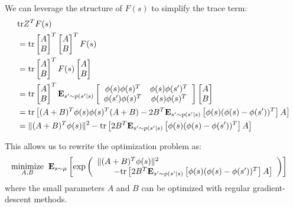 We can leverage the structure of $F(s)$ to simplify the trace term:
\begin{align}
   & \text{tr} Z^T F(s)
  \\ & = \text{tr} \begin{bmatrix} A \\ B \end{bmatrix}^T \begin{bmatrix} A \\ B \end{bmatrix}^T F(s)
  \\ & = \text{tr} \begin{bmatrix} A \\ B \end{bmatrix}^T F(s) \begin{bmatrix} A \\ B \end{bmatrix}
  \\ & = \text{tr} \begin{bmatrix} A \\ B \end{bmatrix}^T  \mathbf{E}_{s' \sim p(s'|s)}  \left[ \begin{array}{cc} \phi(s)\phi(s)^T & \phi(s)\phi(s')^T \\ \phi(s')\phi(s)^T & \phi(s)\phi(s)^T \end{array} \right]
  \begin{bmatrix} A \\ B \end{bmatrix}
  \\  & = \text{tr} \left[
    (A + B)^T \phi(s)\phi(s)^T (A+B)
    - 2B^T \mathbf{E}_{s' \sim p(s'|s)} \left [\phi(s)(\phi(s)- \phi(s'))^T \right ] A
    \right]
  \\  & = \| (A + B)^T \phi(s) \|^2 - \text{tr} \left[
    2B^T \mathbf{E}_{s' \sim p(s'|s)} \left[ \phi(s)(\phi(s)- \phi(s'))^T \right] A
    \right]
\end{align}


This allows us to rewrite the optimization problem as:
\begin{align}
  \underset{A,B}{\text{minimize}} & \;\; \mathbf{E}_{s\sim\mu} \left [ \exp\left(
    \begin{array}{l}
      \| (A + B)^T \phi(s) \|^2
      \\ \qquad- \text{tr} \left[
        2B^T \mathbf{E}_{s' \sim p(s'|s)} \left[ \phi(s)(\phi(s)- \phi(s'))^T \right] A
        \right]
    \end{array}
    \right) \right ]
\end{align}
where the small parameters $A$ and $B$ can be optimized with regular gradient-descent methods.


